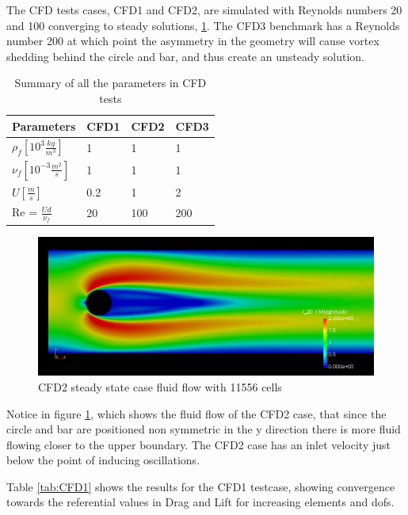 The CFD tests cases, CFD1 and CFD2, are simulated with Reynolds numbers 20 and 100 converging to steady solutions, \ref{tab:cfd_para}. The CFD3 benchmark has a Reynolds number 200 at which point the asymmetry in the geometry will cause vortex shedding behind the circle and bar, and thus create an unsteady solution.

\vspace{1cm}

\begin{table}[H]
\centering
\caption{Summary of all the parameters in CFD tests}
\label{tab:cfd_para}
\begin{tabular}{|l|l|l|l|}
\hline
Parameters & CFD1 & CFD2 & CFD3 \\ \hline
$\rho_f [10^3 \frac{kg}{m^3}]$ & 1 & 1 & 1 \\ \hline
$\nu_f [10^{-3} \frac{m^2}{s}]$ & 1 & 1 & 1 \\ \hline
$ U [\frac{m}{s}] $ & 0.2 & 1 & 2 \\ \hline
Re = $\frac{Ud}{\nu_f}$ & 20 & 100 & 200 \\ \hline
\end{tabular}
\end{table}

\begin{figure}[H]
\label{fig:CFD2}
\includegraphics[scale=0.45, trim={9mm 0mm 0mm 10mm},clip]{./Verification_Validation/Hron_Turek/CFD2.png}
\caption{CFD2 steady state case fluid flow with 11556 cells}
\end{figure}

Notice in figure \ref{fig:CFD2}, which shows the fluid flow of the CFD2 case, that since the circle and bar are positioned non symmetric in the y direction there is more fluid flowing closer to the upper boundary. The CFD2 case has an inlet velocity just below the point of inducing oscillations.

Table \ref{tab:CFD1} shows the results for the CFD1 testcase, showing convergence towards the referential values in Drag and Lift for increasing elements and dofs.


